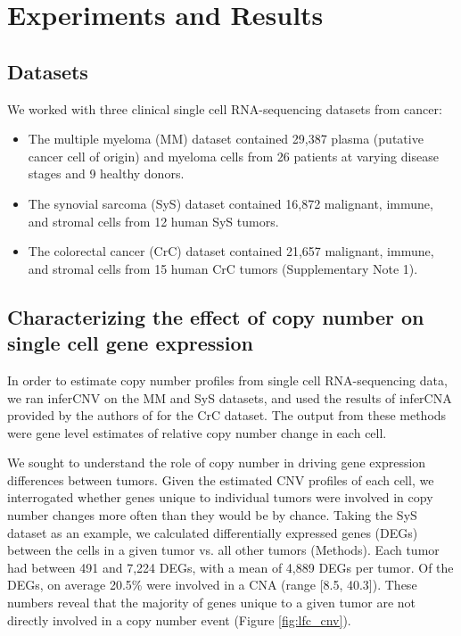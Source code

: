 \documentclass{article}
\begin{document}
\section{Experiments and Results}
\subsection{Datasets}
We worked with three clinical single cell RNA-sequencing datasets from cancer:
\begin{itemize}
    \item The multiple myeloma (MM) dataset \citep{boiarsky2022single} contained 29,387 plasma (putative cancer cell of origin) and myeloma cells from 26 patients at varying disease stages and 9 healthy donors.
    \item The synovial sarcoma (SyS) dataset \citep{jerby2021opposing} contained 16,872  malignant, immune, and stromal cells from 12 human SyS tumors.
    \item The colorectal cancer (CrC) dataset \citep{lee2020lineage} contained 21,657 malignant, immune, and stromal cells from 15 human CrC tumors (Supplementary Note 1).
\end{itemize}

\subsection{Characterizing the effect of copy number on single cell gene expression}
\label{sec:CNA_res}

In order to estimate copy number profiles from single cell RNA-sequencing data, we ran inferCNV on the MM and SyS datasets, and used the results of inferCNA  provided by the authors of \cite{gavish2023hallmarks} for the CrC dataset. The output from these methods were gene level estimates of relative copy number change in each cell. 

We sought to understand the role of copy number in driving gene expression differences between tumors. Given the estimated CNV profiles of each cell, we interrogated whether genes unique to individual tumors were involved in copy number changes more often than they would be by chance. Taking the SyS dataset as an example, we calculated differentially expressed genes (DEGs) between the cells in a given tumor vs. all other tumors (Methods). Each tumor had between 491 and 7,224 DEGs, with a mean of 4,889 DEGs per tumor. Of the DEGs, on average 20.5\% were involved in a CNA (range [8.5, 40.3]). These numbers reveal that the majority of genes unique to a given tumor are not directly involved in a copy number event (Figure \ref{fig:lfc_cnv}). 
\end{document}
